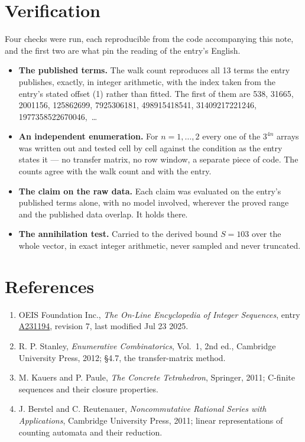 \documentclass[11pt]{article}
\theoremstyle{definition}
\begin{document}
\section{Verification}

Four checks were run, each reproducible from the code accompanying this note, and the first two are what pin the reading of the entry's English.

\begin{itemize}

\item {\bfseries The published terms.} The walk count reproduces all 13 terms the entry publishes, exactly, in integer arithmetic, with the index taken from the entry's stated offset (1) rather than fitted. The first of them are 538, 31665, 2001156, 125862699, 7925306181, 498915418541, 31409217221246, 1977358522670046,~\dots

\item {\bfseries An independent enumeration.} For $n = 1,\dots,2$ every one of the $3^{4n}$ arrays was written out and tested cell by cell against the condition as the entry states it --- no transfer matrix, no row window, a separate piece of code. The counts agree with the walk count and with the entry.

\item {\bfseries The claim on the raw data.} Each claim was evaluated on the entry's published terms alone, with no model involved, wherever the proved range and the published data overlap. It holds there.

\item {\bfseries The annihilation test.} Carried to the derived bound $S = 103$ over the whole vector, in exact integer arithmetic, never sampled and never truncated.

\end{itemize}

\section{References}

\begin{enumerate}

\item OEIS Foundation Inc., \emph{The On-Line Encyclopedia of Integer Sequences}, entry \href{https://oeis.org/A231194}{A231194}, revision 7, last modified Jul 23 2025.

\item R. P. Stanley, \emph{Enumerative Combinatorics}, Vol.~1, 2nd ed., Cambridge University Press, 2012; \S4.7, the transfer-matrix method.

\item M. Kauers and P. Paule, \emph{The Concrete Tetrahedron}, Springer, 2011; C-finite sequences and their closure properties.

\item J. Berstel and C. Reutenauer, \emph{Noncommutative Rational Series with Applications}, Cambridge University Press, 2011; linear representations of counting automata and their reduction.

\end{enumerate}
\end{document}
